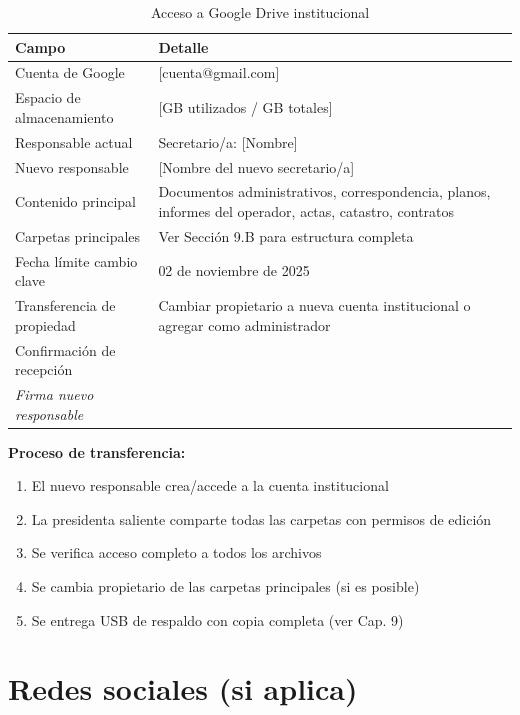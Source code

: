 \begin{table}[H]
\centering
\caption{Acceso a Google Drive institucional}
\label{tab:acceso-drive}
\begin{tabularx}{\textwidth}{@{}lX@{}}
\toprule
\textbf{Campo} & \textbf{Detalle} \\
\midrule
Cuenta de Google & [cuenta@gmail.com] \\
Espacio de almacenamiento & [GB utilizados / GB totales] \\
Responsable actual & Secretario/a: [Nombre] \\
Nuevo responsable & [Nombre del nuevo secretario/a] \\
Contenido principal & Documentos administrativos, correspondencia, planos, informes del operador, actas, catastro, contratos \\
Carpetas principales & Ver Sección 9.B para estructura completa \\
Fecha límite cambio clave & 02 de noviembre de 2025 \\
Transferencia de propiedad & Cambiar propietario a nueva cuenta institucional o agregar como administrador \\
Confirmación de recepción & \underline{\hspace{5cm}} \\ \emph{Firma nuevo responsable} \\
\bottomrule
\end{tabularx}
\end{table}

\textbf{Proceso de transferencia:}
\begin{enumerate}
  \item El nuevo responsable crea/accede a la cuenta institucional
  \item La presidenta saliente comparte todas las carpetas con permisos de edición
  \item Se verifica acceso completo a todos los archivos
  \item Se cambia propietario de las carpetas principales (si es posible)
  \item Se entrega USB de respaldo con copia completa (ver Cap. 9)
\end{enumerate}

\section{Redes sociales (si aplica)}

